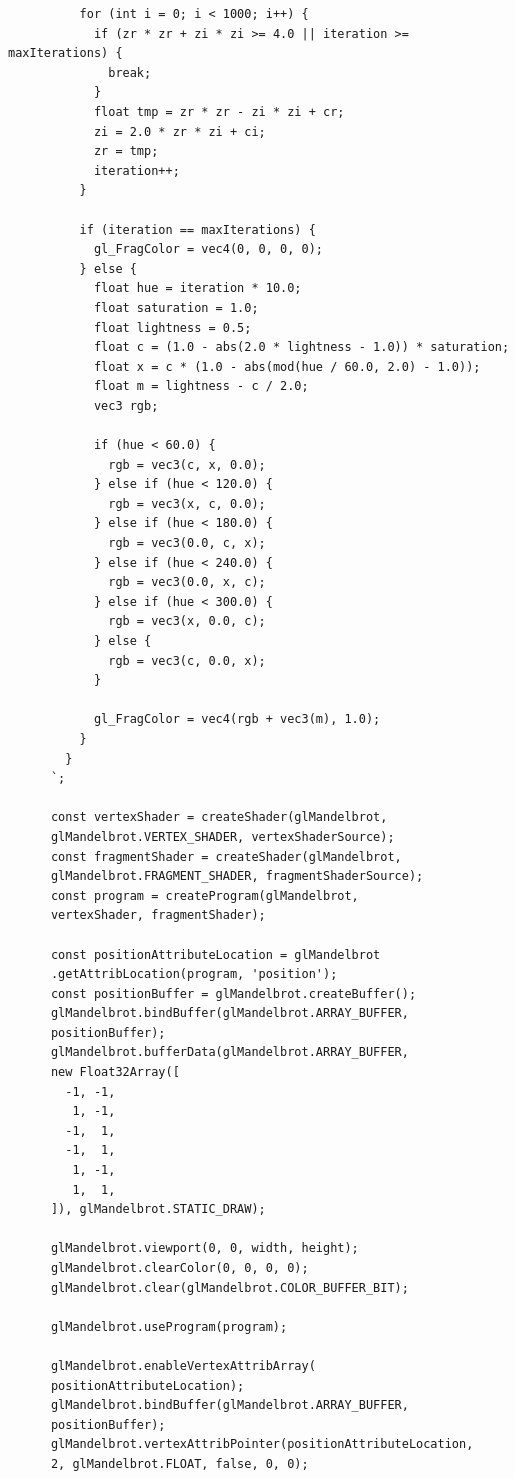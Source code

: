 \documentclass[12pt,a4paper]{report}
\begin{document}
\begin{verbatim}
          for (int i = 0; i < 1000; i++) {
            if (zr * zr + zi * zi >= 4.0 || iteration >= maxIterations) {
              break;
            }
            float tmp = zr * zr - zi * zi + cr;
            zi = 2.0 * zr * zi + ci;
            zr = tmp;
            iteration++;
          }

          if (iteration == maxIterations) {
            gl_FragColor = vec4(0, 0, 0, 0);
          } else {
            float hue = iteration * 10.0;
            float saturation = 1.0;
            float lightness = 0.5;
            float c = (1.0 - abs(2.0 * lightness - 1.0)) * saturation;
            float x = c * (1.0 - abs(mod(hue / 60.0, 2.0) - 1.0));
            float m = lightness - c / 2.0;
            vec3 rgb;

            if (hue < 60.0) {
              rgb = vec3(c, x, 0.0);
            } else if (hue < 120.0) {
              rgb = vec3(x, c, 0.0);
            } else if (hue < 180.0) {
              rgb = vec3(0.0, c, x);
            } else if (hue < 240.0) {
              rgb = vec3(0.0, x, c);
            } else if (hue < 300.0) {
              rgb = vec3(x, 0.0, c);
            } else {
              rgb = vec3(c, 0.0, x);
            }

            gl_FragColor = vec4(rgb + vec3(m), 1.0);
          }
        }
      `;

      const vertexShader = createShader(glMandelbrot, 
      glMandelbrot.VERTEX_SHADER, vertexShaderSource);
      const fragmentShader = createShader(glMandelbrot, 
      glMandelbrot.FRAGMENT_SHADER, fragmentShaderSource);
      const program = createProgram(glMandelbrot, 
      vertexShader, fragmentShader);

      const positionAttributeLocation = glMandelbrot
      .getAttribLocation(program, 'position');
      const positionBuffer = glMandelbrot.createBuffer();
      glMandelbrot.bindBuffer(glMandelbrot.ARRAY_BUFFER, 
      positionBuffer);
      glMandelbrot.bufferData(glMandelbrot.ARRAY_BUFFER, 
      new Float32Array([
        -1, -1,
         1, -1,
        -1,  1,
        -1,  1,
         1, -1,
         1,  1,
      ]), glMandelbrot.STATIC_DRAW);

      glMandelbrot.viewport(0, 0, width, height);
      glMandelbrot.clearColor(0, 0, 0, 0);
      glMandelbrot.clear(glMandelbrot.COLOR_BUFFER_BIT);

      glMandelbrot.useProgram(program);

      glMandelbrot.enableVertexAttribArray(
      positionAttributeLocation);
      glMandelbrot.bindBuffer(glMandelbrot.ARRAY_BUFFER, 
      positionBuffer);
      glMandelbrot.vertexAttribPointer(positionAttributeLocation, 
      2, glMandelbrot.FLOAT, false, 0, 0);


\end{verbatim}
\end{document}
